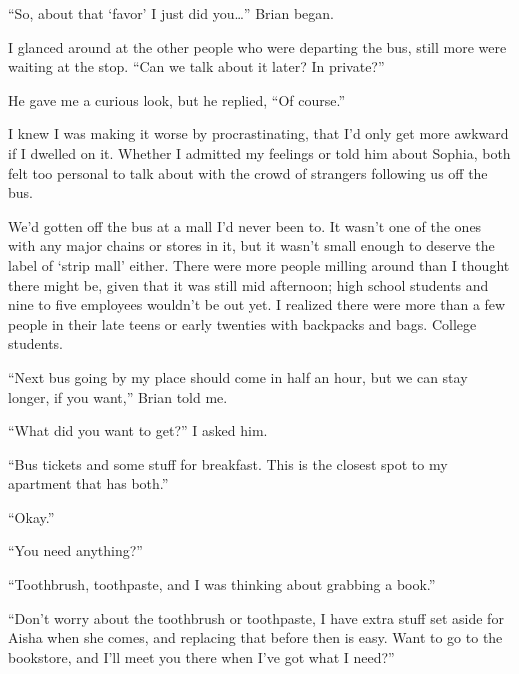 





``So, about that `favor' I just did you\ldots'' Brian began.



I glanced around at the other people who were departing the bus, still more were waiting at the stop.  ``Can we talk about it later?  In private?''



He gave me a curious look, but he replied, ``Of course.''



I knew I was making it worse by procrastinating, that I'd only get more awkward if I dwelled on it.  Whether I admitted my feelings or told him about Sophia, both felt too personal to talk about with the crowd of strangers following us off the bus.



We'd gotten off the bus at a mall I'd never been to.  It wasn't one of the ones with any major chains or stores in it, but it wasn't small enough to deserve the label of `strip mall' either.  There were more people milling around than I thought there might be, given that it was still mid afternoon; high school students and nine to five employees wouldn't be out yet.  I realized there were more than a few people in their late teens or early twenties with backpacks and bags.  College students.



``Next bus going by my place should come in half an hour, but we can stay longer, if you want,'' Brian told me.



``What did you want to get?'' I asked him.



``Bus tickets and some stuff for breakfast.  This is the closest spot to my apartment that has both.''



``Okay.''



``You need anything?''



``Toothbrush, toothpaste, and I was thinking about grabbing a book.''



``Don't worry about the toothbrush or toothpaste, I have extra stuff set aside for Aisha when she comes, and replacing that before then is easy.  Want to go to the bookstore, and I'll meet you there when I've got what I need?''



